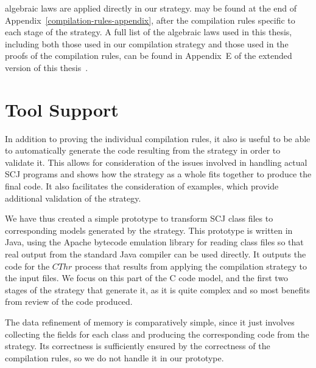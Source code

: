  algebraic laws 
are applied directly in our strategy.
 may be found at the end of
Appendix~\ref{compilation-rules-appendix}, after the compilation rules
specific to each stage of the strategy.
A full list of the algebraic laws used in this thesis, including both
those used in our compilation strategy and those used in the proofs of
the compilation rules, can be found in Appendix~E of the extended
version of this thesis~\cite{baxter2018-extended}.


\section{Tool Support}
\label{tool-support-section}

In addition to proving the individual compilation rules, it also is
useful to be able to automatically generate the code resulting from
the strategy in order to validate it.
This allows for consideration of the issues involved in handling
actual SCJ programs and shows how the strategy as a whole fits
together to produce the final code.
It also facilitates the consideration of examples, which provide
additional validation of the strategy.

We have thus created a simple prototype to transform SCJ class files
to corresponding \Circus{} models generated by the strategy.
This prototype is written in Java, using the Apache bytecode emulation
library for reading class files so that real output from the standard
Java compiler can be used directly.
It outputs the \Circus{} code for the $CThr$ process that results from
applying the compilation strategy to the input files.
We focus on this part of the C code model, and the first two stages of
the strategy that generate it, as it is quite complex and so most
benefits from review of the code produced.

The data refinement of memory is comparatively simple, since it just
involves collecting the fields for each class and producing the
corresponding \Circus{} code from the strategy.
Its correctness is sufficiently ensured by the correctness of the
compilation rules, so we do not handle it in our prototype.

